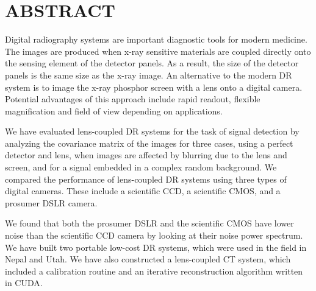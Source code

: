 \chapter*{ABSTRACT}

Digital radiography systems are important diagnostic tools for modern medicine.  The images are produced when x-ray sensitive materials are coupled directly onto the sensing element of the detector panels.  As a result, the size of the detector panels is the same size as the x-ray image.  An alternative to the modern DR system is to image the x-ray phosphor screen with a lens onto a digital camera.  Potential advantages of this approach include rapid readout, flexible magnification and field of view depending on applications.  

We have evaluated lens-coupled DR systems for the task of signal detection by analyzing the covariance matrix of the images for three cases, using a perfect detector and lens, when images are affected by blurring due to the lens and screen, and for a signal embedded in a complex random background.  We compared the performance of lens-coupled DR systems using three types of digital cameras.  These include a scientific CCD, a scientific CMOS, and a prosumer DSLR camera.

We found that both the prosumer DSLR and the scientific CMOS have lower noise than the scientific CCD camera by looking at their noise power spectrum. We have built two portable low-cost DR systems, which were used in the field in Nepal and Utah. We have also constructed a lens-coupled CT system, which included a calibration routine and an iterative reconstruction algorithm written in CUDA.
